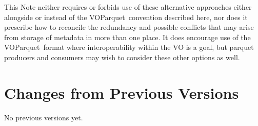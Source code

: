 \documentclass[11pt,a4paper]{ivoa}
\newcommand{\voparquet}{VOParquet}
\begin{document}
This Note neither requires or forbids use of these alternative
approaches either alongside or instead of the \voparquet\ convention
described here, nor does it prescribe how to reconcile
the redundancy and possible conflicts that may arise from
storage of metadata in more than one place.
It does encourage use of the \voparquet\ format where interoperability
within the VO is a goal,
but parquet producers and consumers may wish to consider these other
options as well.



\appendix
\section{Changes from Previous Versions}

No previous versions yet.


\end{document}
